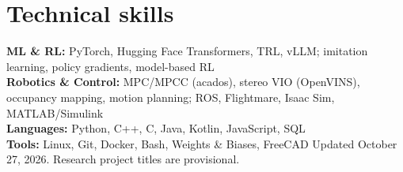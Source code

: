 \documentclass[10pt,letterpaper]{article}
\begin{document}
\section{Technical skills}
\textbf{ML \& RL:} PyTorch, Hugging Face Transformers, TRL, vLLM; imitation learning, policy gradients, model-based RL\\
\textbf{Robotics \& Control:} MPC/MPCC (acados), stereo VIO (OpenVINS), occupancy mapping, motion planning; ROS, Flightmare, Isaac Sim, MATLAB/Simulink\\
\textbf{Languages:} Python, C++, C, Java, Kotlin, JavaScript, SQL\\
\textbf{Tools:} Linux, Git, Docker, Bash, Weights \& Biases, FreeCAD
\vfill
{\small\color{gray}Updated October 27, 2026. Research project titles are provisional.}
\end{document}

